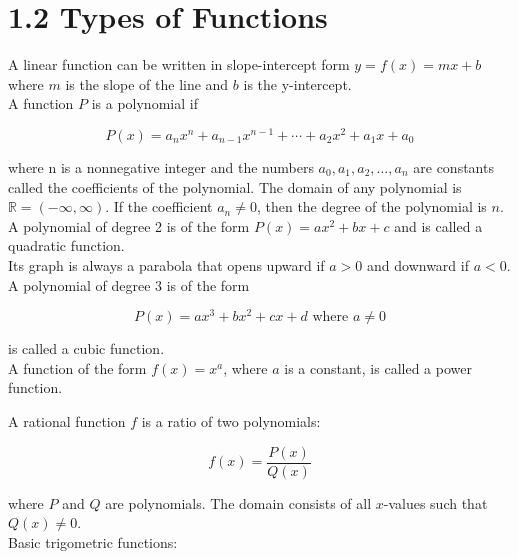 %
%

\section*{1.2 Types of Functions}

A linear function can be written in slope-intercept form \(y=f(x)=mx+b\) where \(m\) is the slope of the line and \(b\) is the y-intercept.\\

A function \(P\) is a polynomial if 

$$P(x)=a_n{x}^n+a_{n-1}x^{n-1}+ \cdots +a_2x^2+a_1x+a_0$$

where n is a nonnegative integer and the numbers \(a_0, a_1, a_2, \ldots ,a_n\) are constants called the coefficients of the polynomial. The domain of any polynomial is \(\mathbb{R} = (-\infty, \infty)\). If the coefficient \(a_n \neq 0\), then the degree of the polynomial is \(n\).\\

A polynomial of degree 2 is of the form \(P(x)=ax^2+bx+c\) and is called a quadratic function.\\ Its graph is always a parabola that opens upward if \(a > 0\) and downward if \(a < 0\).\\

A polynomial of degree 3 is of the form 

\[ P(x)=ax^3+bx^2+cx+d \text{ where } a \neq 0 \]

is called a cubic function.\\

A function of the form \(f(x) = x^a\), where \(a\) is a constant, is called a power function.

A rational function \(f\) is a ratio of two polynomials:

\[ f(x)=\frac{P(x)}{Q(x)} \]

where \(P\) and \(Q\) are polynomials. The domain consists of all \(x\)-values such that \( Q(x) \neq 0 \).\\

Basic trigometric functions:\\

\begin{center}
\end{center}

